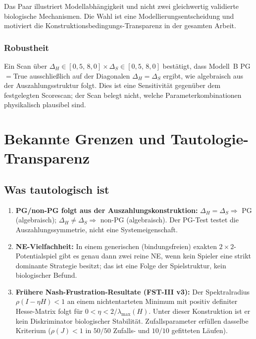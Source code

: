 \documentclass[12pt,a4paper]{article}
\begin{document}
Das Paar illustriert Modellabhängigkeit und nicht zwei gleichwertig
validierte biologische Mechanismen. Die Wahl ist eine
Modellierungsentscheidung und motiviert die
Konstruktionsbedingungs-Transparenz in der gesamten Arbeit.

\subsubsection{Robustheit}

Ein Scan über $\Delta_H \in [0{,}5,\, 8{,}0] \times \Delta_S \in [0{,}5,\, 8{,}0]$
bestätigt, dass Modell~B PG$=$True ausschließlich auf der Diagonalen
$\Delta_H = \Delta_S$ ergibt, wie algebraisch aus der
Auszahlungsstruktur folgt. Dies ist eine Sensitivität gegenüber dem
festgelegten Scorescan; der Scan belegt nicht, welche
Parameterkombinationen physikalisch plausibel sind.


\section{Bekannte Grenzen und Tautologie-Transparenz}
\label{sec:tautology}

\subsection{Was tautologisch ist}

\begin{enumerate}
  \item \textbf{PG/non-PG folgt aus der Auszahlungskonstruktion:}
    $\Delta_H = \Delta_S \Rightarrow$ PG (algebraisch);
    $\Delta_H \neq \Delta_S \Rightarrow$ non-PG (algebraisch).
    Der PG-Test testet die Auszahlungssymmetrie, nicht eine
    Systemeigenschaft.

  \item \textbf{NE-Vielfachheit:} In einem generischen (bindungsfreien)
    exakten $2\times 2$-Potentialspiel gibt es genau dann zwei reine NE,
    wenn kein Spieler eine strikt dominante Strategie besitzt; das ist eine
    Folge der Spielstruktur, kein biologischer Befund.

  \item \textbf{Frühere Nash-Frustration-Resultate (FST-III v3):} Der
    Spektralradius $\rho(I-\eta H)<1$ an einem nichtentarteten Minimum
    mit positiv definiter Hesse-Matrix folgt für
    $0<\eta<2/\lambda_{\max}(H)$. Unter dieser Konstruktion ist er kein
    Diskriminator biologischer Stabilität. Zufallsparameter erfüllen dasselbe Kriterium
    ($\rho(J)<1$ in $50/50$ Zufalls- und $10/10$ gefitteten Läufen).
\end{enumerate}
\end{document}
